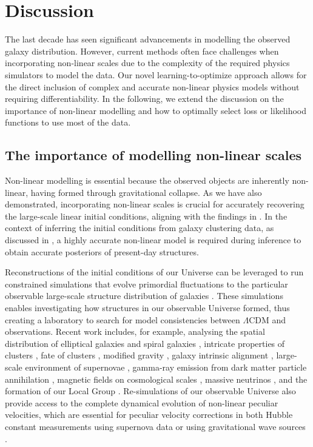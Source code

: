 \section{Discussion}
\label{sec:disc}
The last decade has seen significant advancements in modelling the observed galaxy distribution. However, current methods often face challenges when incorporating non-linear scales due to the complexity of the required physics simulators to model the data. Our novel learning-to-optimize approach allows for the direct inclusion of complex and accurate non-linear physics models without requiring differentiability. In the following, we extend the discussion on the importance of non-linear modelling and how to optimally select loss or likelihood functions to use most of the data. 

\subsection{The importance of modelling non-linear scales}
\label{sec:discuss_non_linear}

Non-linear modelling is essential because the observed objects are inherently non-linear, having formed through gravitational collapse. As we have also demonstrated, incorporating non-linear scales is crucial for accurately recovering the large-scale linear initial conditions, aligning with the findings in \citet{Doeser2024}. In the context of inferring the initial conditions from galaxy clustering data, as discussed in \citet{Stopyra2023}, a highly accurate non-linear model is required during inference to obtain accurate posteriors of present-day structures. 

Reconstructions of the initial conditions of our Universe can be leveraged to run constrained simulations that evolve primordial fluctuations to the particular observable large-scale structure distribution of galaxies \citep[see e.g.][]{Wang2016,Sorce2018,Gottl,Libeskind2020,Mcalpine2022,Sawala2020,Hutt2022,Ata2022,Byrohl2024,Wempe2024}. These simulations enables investigating how structures in our observable Universe formed, thus creating a laboratory to search for model consistencies between $\Lambda$CDM and observations. Recent work includes, for example, analysing the spatial distribution of elliptical galaxies and spiral galaxies \citep{Sawala2023}, intricate properties of clusters \citep{Sorce2018,Jasche2019,Mcalpine2022,Hutt2022}, fate of clusters \citep{Ata2022}, modified gravity \citep{Bartlett2021}, galaxy intrinsic alignment \citep{Tsaprazi2021}, large-scale environment of supernovae \citep{Tsaprazi2022}, gamma-ray emission from dark matter particle annihilation \citep{Kostic2023}, magnetic fields on cosmological scales \citep{Hutschenreuter2018}, massive neutrinos \citep{Elbers2023}, and the formation of our Local Group \citep{Wempe2024,Wempe2025}. Re-simulations of our observable Universe also provide access to the complete dynamical evolution of non-linear peculiar velocities, which are essential for peculiar velocity corrections in both Hubble constant measurements using supernova data \citep[e.g.,][]{Kenworthy2022, Riess2022, Peterson2022} or using gravitational wave sources \citep{Mukherjee2021}. 

